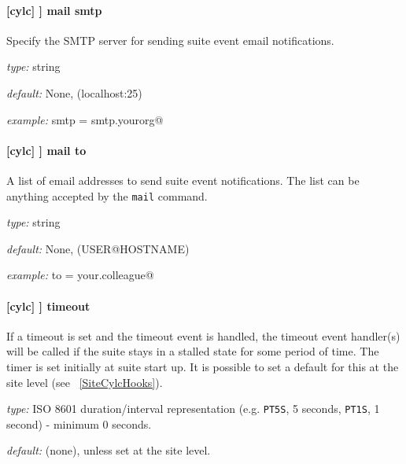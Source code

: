 \paragraph[mail smtp]{[cylc] \textrightarrow [[events]] \textrightarrow mail smtp}

Specify the SMTP server for sending suite event email notifications.

\begin{myitemize}
    \item {\em type:} string
    \item {\em default:} None, (localhost:25)
    \item {\em example:} \lstinline@mail smtp = smtp.yourorg@
\end{myitemize}

\paragraph[mail to]{[cylc] \textrightarrow [[events]] \textrightarrow mail to}

A list of email addresses to send suite event notifications. The list can be
anything accepted by the \lstinline=mail= command.

\begin{myitemize}
    \item {\em type:} string
    \item {\em default:} None, (USER@HOSTNAME)
    \item {\em example:} \lstinline@mail to = your.colleague@
\end{myitemize}

\paragraph[timeout]{[cylc] \textrightarrow [[events]] \textrightarrow timeout}

If a timeout is set and the timeout event is handled, the timeout event
handler(s) will be called if the suite stays in a stalled state for some period
of time. The timer is set initially at suite start up. It is possible to set a
default for this at the site level (see ~\ref{SiteCylcHooks}).

\begin{myitemize}
    \item {\em type:} ISO 8601 duration/interval representation (e.g.
 \lstinline=PT5S=, 5 seconds, \lstinline=PT1S=, 1 second) - minimum 0 seconds.
    \item {\em default:} (none), unless set at the site level.
\end{myitemize}

